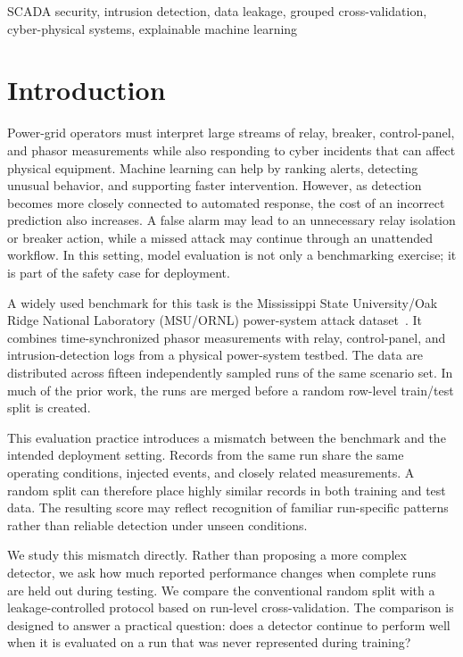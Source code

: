 \documentclass[conference,a4paper]{IEEEtran}
\begin{document}
\begin{IEEEkeywords}
SCADA security, intrusion detection, data leakage, grouped cross-validation, cyber-physical systems, explainable machine learning
\end{IEEEkeywords}

\section{Introduction}

Power-grid operators must interpret large streams of relay, breaker, control-panel, and phasor measurements while also responding to cyber incidents that can affect physical equipment. Machine learning can help by ranking alerts, detecting unusual behavior, and supporting faster intervention. However, as detection becomes more closely connected to automated response, the cost of an incorrect prediction also increases. A false alarm may lead to an unnecessary relay isolation or breaker action, while a missed attack may continue through an unattended workflow. In this setting, model evaluation is not only a benchmarking exercise; it is part of the safety case for deployment.

A widely used benchmark for this task is the Mississippi State University/Oak Ridge National Laboratory (MSU/ORNL) power-system attack dataset~\cite{beaver2013power,pan2015classification}. It combines time-synchronized phasor measurements with relay, control-panel, and intrusion-detection logs from a physical power-system testbed. The data are distributed across fifteen independently sampled runs of the same scenario set. In much of the prior work, the runs are merged before a random row-level train/test split is created.

This evaluation practice introduces a mismatch between the benchmark and the intended deployment setting. Records from the same run share the same operating conditions, injected events, and closely related measurements. A random split can therefore place highly similar records in both training and test data. The resulting score may reflect recognition of familiar run-specific patterns rather than reliable detection under unseen conditions.

We study this mismatch directly. Rather than proposing a more complex detector, we ask how much reported performance changes when complete runs are held out during testing. We compare the conventional random split with a leakage-controlled protocol based on run-level cross-validation. The comparison is designed to answer a practical question: does a detector continue to perform well when it is evaluated on a run that was never represented during training?
\end{document}
